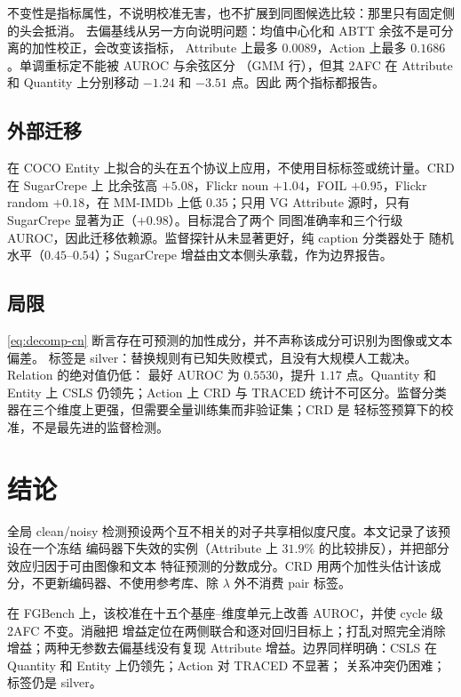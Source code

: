 \documentclass[10pt,twocolumn,a4paper]{ctexart}
\begin{document}
不变性是指标属性，不说明校准无害，也不扩展到同图候选比较：那里只有固定侧的头会抵消。
去偏基线从另一方向说明问题：均值中心化和 ABTT 余弦不是可分离的加性校正，会改变该指标，
Attribute 上最多 $0.0089$，Action 上最多 $0.1686$。单调重标定不能被 AUROC 与余弦区分
（GMM 行），但其 2AFC 在 Attribute 和 Quantity 上分别移动 $-1.24$ 和 $-3.51$ 点。因此
两个指标都报告。

\subsection{外部迁移}
在 COCO Entity 上拟合的头在五个协议上应用，不使用目标标签或统计量。CRD 在 SugarCrepe 上
比余弦高 $+5.08$，Flickr noun $+1.04$，FOIL $+0.95$，Flickr random $+0.18$，在 MM-IMDb
上低 $0.35$；只用 VG Attribute 源时，只有 SugarCrepe 显著为正（$+0.98$）。目标混合了两个
同图准确率和三个行级 AUROC，因此迁移依赖源。监督探针从未显著更好，纯 caption 分类器处于
随机水平（$0.45$--$0.54$）；SugarCrepe 增益由文本侧头承载，作为边界报告。

\subsection{局限}
\eqref{eq:decomp-cn} 断言存在可预测的加性成分，并不声称该成分可识别为图像或文本偏差。
标签是 silver：替换规则有已知失败模式，且没有大规模人工裁决。Relation 的绝对值仍低：
最好 AUROC 为 $0.5530$，提升 $1.17$ 点。Quantity 和 Entity 上 CSLS 仍领先；Action 上 CRD
与 TRACED 统计不可区分。监督分类器在三个维度上更强，但需要全量训练集而非验证集；CRD 是
轻标签预算下的校准，不是最先进的监督检测。

\section{结论}
\label{sec:conclusion-cn}

全局 clean/noisy 检测预设两个互不相关的对子共享相似度尺度。本文记录了该预设在一个冻结
编码器下失效的实例（Attribute 上 $31.9\%$ 的比较排反），并把部分效应归因于可由图像和文本
特征预测的分数成分。CRD 用两个加性头估计该成分，不更新编码器、不使用参考库、除 $\lambda$
外不消费 pair 标签。

在 FGBench 上，该校准在十五个基座--维度单元上改善 AUROC，并使 cycle 级 2AFC 不变。消融把
增益定位在两侧联合和逐对回归目标上；打乱对照完全消除增益；两种无参数去偏基线没有复现
Attribute 增益。边界同样明确：CSLS 在 Quantity 和 Entity 上仍领先；Action 对 TRACED 不显著；
关系冲突仍困难；标签仍是 silver。
\end{document}
